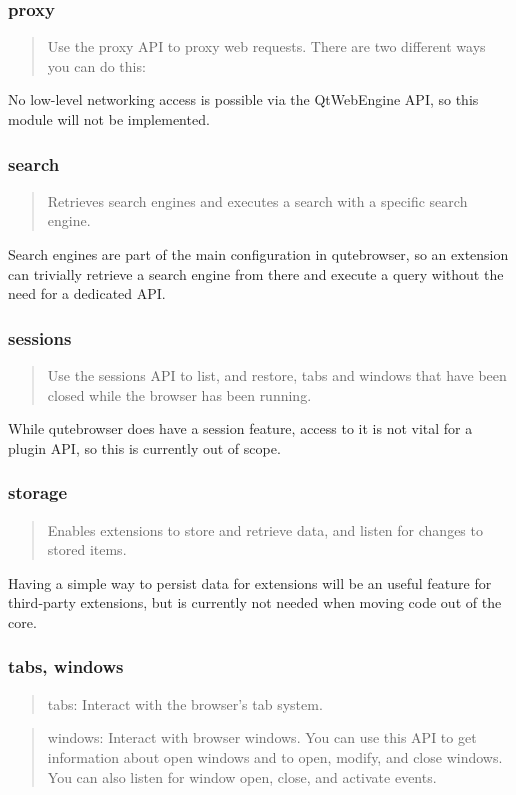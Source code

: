 \documentclass[a4paper,parskip=full]{scrreprt}
\begin{document}
\subsubsection{proxy}
\begin{quote}
Use the proxy API to proxy web requests. There are two different ways you can do this:
\end{quote}

No low-level networking access is possible via the QtWebEngine API, so this
module will not be implemented.

\subsubsection{search}
\begin{quote}
Retrieves search engines and executes a search with a specific search engine.
\end{quote}

Search engines are part of the main configuration in qutebrowser, so an
extension can trivially retrieve a search engine from there and execute a query
without the need for a dedicated API.

\subsubsection{sessions}
\begin{quote}
Use the sessions API to list, and restore, tabs and windows that have been closed while the browser has been running.
\end{quote}

While qutebrowser does have a session feature, access to it is not vital for a
plugin API, so this is currently out of scope.

\subsubsection{storage}
\begin{quote}
Enables extensions to store and retrieve data, and listen for changes to stored items.
\end{quote}

Having a simple way to persist data for extensions will be an useful feature for
third-party extensions, but is currently not needed when moving code out of the core.

\subsubsection{tabs, windows}
\begin{quote}
tabs: Interact with the browser's tab system.
\end{quote}
\begin{quote}
windows: Interact with browser windows. You can use this API to get information about open windows and to open, modify, and close windows. You can also listen for window open, close, and activate events.
\end{quote}
\end{document}
